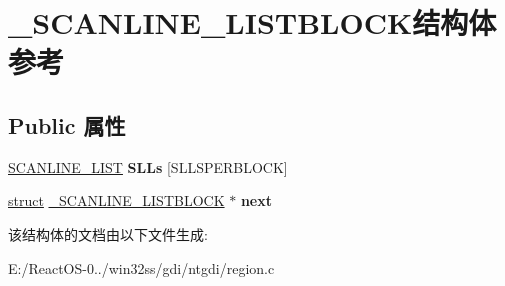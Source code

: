 \hypertarget{struct___s_c_a_n_l_i_n_e___l_i_s_t_b_l_o_c_k}{}\section{\+\_\+\+S\+C\+A\+N\+L\+I\+N\+E\+\_\+\+L\+I\+S\+T\+B\+L\+O\+C\+K结构体 参考}
\label{struct___s_c_a_n_l_i_n_e___l_i_s_t_b_l_o_c_k}
\subsection*{Public 属性}
\begin{DoxyCompactItemize}
\item 
\mbox{\label{struct___s_c_a_n_l_i_n_e___l_i_s_t_b_l_o_c_k_ac915a69fd9ae514b2da43a17c606da56}} 
\hyperlink{struct___s_c_a_n_l_i_n_e___l_i_s_t}{S\+C\+A\+N\+L\+I\+N\+E\+\_\+\+L\+I\+ST} {\bfseries S\+L\+Ls} \mbox{[}S\+L\+L\+S\+P\+E\+R\+B\+L\+O\+CK\mbox{]}
\item 
\mbox{\label{struct___s_c_a_n_l_i_n_e___l_i_s_t_b_l_o_c_k_a9eacdc5c58284fc7236e595b1af591e2}} 
\hyperlink{interfacestruct}{struct} \hyperlink{struct___s_c_a_n_l_i_n_e___l_i_s_t_b_l_o_c_k}{\+\_\+\+S\+C\+A\+N\+L\+I\+N\+E\+\_\+\+L\+I\+S\+T\+B\+L\+O\+CK} $\ast$ {\bfseries next}
\end{DoxyCompactItemize}


该结构体的文档由以下文件生成\+:\begin{DoxyCompactItemize}
\item 
E\+:/\+React\+O\+S-\/0../win32ss/gdi/ntgdi/region.\+c\end{DoxyCompactItemize}
